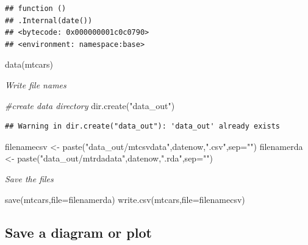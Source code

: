 \documentclass[
]{article}
\newenvironment{Shaded}{\begin{snugshade}}{\end{snugshade}}
\newcommand{\AttributeTok}[1]{\textcolor[rgb]{0.77,0.63,0.00}{#1}}
\newcommand{\CommentTok}[1]{\textcolor[rgb]{0.56,0.35,0.01}{\textit{#1}}}
\newcommand{\FunctionTok}[1]{\textcolor[rgb]{0.00,0.00,0.00}{#1}}
\newcommand{\NormalTok}[1]{#1}
\newcommand{\OtherTok}[1]{\textcolor[rgb]{0.56,0.35,0.01}{#1}}
\newcommand{\StringTok}[1]{\textcolor[rgb]{0.31,0.60,0.02}{#1}}
\begin{document}
\begin{verbatim}
## function () 
## .Internal(date())
## <bytecode: 0x000000001c0c0790>
## <environment: namespace:base>
\end{verbatim}

\begin{Shaded}
\begin{Highlighting}[]
\FunctionTok{data}\NormalTok{(mtcars)}
\end{Highlighting}
\end{Shaded}

\emph{Write file names}

\begin{Shaded}
\begin{Highlighting}[]
\CommentTok{\#create data directory}
\FunctionTok{dir.create}\NormalTok{(}\StringTok{"data\_out"}\NormalTok{)}
\end{Highlighting}
\end{Shaded}

\begin{verbatim}
## Warning in dir.create("data_out"): 'data_out' already exists
\end{verbatim}

\begin{Shaded}
\begin{Highlighting}[]
\NormalTok{filenamecsv }\OtherTok{\textless{}{-}} \FunctionTok{paste}\NormalTok{(}\StringTok{"data\_out/mtcsvdata"}\NormalTok{,datenow,}\StringTok{".csv"}\NormalTok{,}\AttributeTok{sep=}\StringTok{""}\NormalTok{)}
\NormalTok{filenamerda }\OtherTok{\textless{}{-}} \FunctionTok{paste}\NormalTok{(}\StringTok{"data\_out/mtrdadata"}\NormalTok{,datenow,}\StringTok{".rda"}\NormalTok{,}\AttributeTok{sep=}\StringTok{""}\NormalTok{)}
\end{Highlighting}
\end{Shaded}

\emph{Save the files}

\begin{Shaded}
\begin{Highlighting}[]
\FunctionTok{save}\NormalTok{(mtcars,}\AttributeTok{file=}\NormalTok{filenamerda)}
\FunctionTok{write.csv}\NormalTok{(mtcars,}\AttributeTok{file=}\NormalTok{filenamecsv)}
\end{Highlighting}
\end{Shaded}

\hypertarget{save-a-diagram-or-plot}{%
\subsection{Save a diagram or plot}\label{save-a-diagram-or-plot}}
\end{document}
